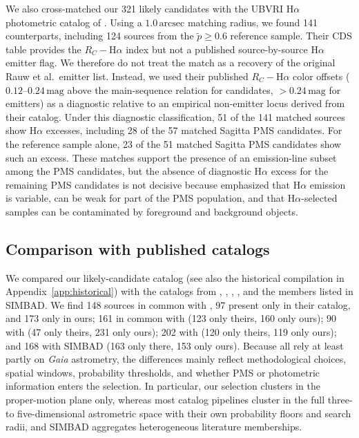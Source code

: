 \documentclass{aa}
\begin{document}
We also cross-matched our 321 likely candidates with the UBVRI H$\alpha$ photometric catalog of \citet{2010AA...511A..25R}. Using a $1.0\,\mathrm{arcsec}$ matching radius, we found 141 counterparts, including 124 sources from the $\tilde{p}\geq0.6$ reference sample. Their CDS table provides the $R_C-$H$\alpha$ index but not a published source-by-source H$\alpha$ emitter flag. We therefore do not treat the match as a recovery of the original Rauw et al.\ emitter list. Instead, we used their published $R_C-$H$\alpha$ color offsets ($0.12$--$0.24\,\mathrm{mag}$ above the main-sequence relation for candidates, $>0.24\,\mathrm{mag}$ for emitters) as a diagnostic relative to an empirical non-emitter locus derived from their catalog. Under this diagnostic classification, 51 of the 141 matched sources show H$\alpha$ excesses, including 28 of the 57 matched Sagitta PMS candidates. For the reference sample alone, 23 of the 51 matched Sagitta PMS candidates show such an excess. These matches support the presence of an emission-line subset among the PMS candidates, but the absence of diagnostic H$\alpha$ excess for the remaining PMS candidates is not decisive because \citet{2010AA...511A..25R} emphasized that H$\alpha$ emission is variable, can be weak for part of the PMS population, and that H$\alpha$-selected samples can be contaminated by foreground and background objects.

\subsection{Comparison with published catalogs}
We compared our likely-candidate catalog (see also the historical compilation in Appendix~\ref{app:historical}) with the catalogs from \citet{2020AA...640A...1C}, \citet{2021ApJ...923..129J}, \citet{2022ApJS..262....7H}, \citet{2024arXiv240305143H}, and the members listed in SIMBAD\@. We find 148 sources in common with \citet{2020AA...640A...1C}, 97 present only in their catalog, and 173 only in ours; 161 in common with \citet{2021ApJ...923..129J} (123 only theirs, 160 only ours); 90 with \citet{2022ApJS..262....7H} (47 only theirs, 231 only ours); 202 with \citet{2024arXiv240305143H} (120 only theirs, 119 only ours); and 168 with SIMBAD (163 only there, 153 only ours). Because all rely at least partly on \textit{Gaia} astrometry, the differences mainly reflect methodological choices, spatial windows, probability thresholds, and whether PMS or photometric information enters the selection. In particular, our selection clusters in the proper-motion plane only, whereas most catalog pipelines cluster in the full three- to five-dimensional astrometric space with their own probability floors and search radii, and SIMBAD aggregates heterogeneous literature memberships.
\end{document}
